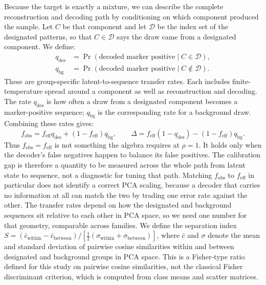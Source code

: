 Because the target is exactly a mixture, we can describe the complete reconstruction and
decoding path by conditioning on which component produced the sample.
Let $C$ be that component and let $\mathcal{D}$ be the index set of the designated patterns, so
that $C\in\mathcal{D}$ says the draw came from a designated component. We define:
\[
\begin{aligned}
q_{\mathrm{des}}
  &= \Pr(\text{decoded marker positive}\mid C\in\mathcal{D}),\\
q_{\mathrm{bg}}
  &= \Pr(\text{decoded marker positive}\mid C\notin\mathcal{D}).
\end{aligned}
\]
These are group-specific latent-to-sequence transfer rates. Each includes
finite-temperature spread around a component as well as reconstruction and decoding.
The rate $q_{\mathrm{des}}$ is how often a draw from a designated component becomes a
marker-positive sequence; $q_{\mathrm{bg}}$ is the corresponding rate for a background draw.
Combining these rates gives:
\begin{equation}\label{eq:decoder-pushforward}
  f_{\mathrm{obs}}
  = f_{\mathrm{eff}}q_{\mathrm{des}}
  + (1-f_{\mathrm{eff}})q_{\mathrm{bg}},
  \qquad
  \Delta
  = f_{\mathrm{eff}}(1-q_{\mathrm{des}})
  - (1-f_{\mathrm{eff}})q_{\mathrm{bg}}.
\end{equation}
Thus $f_{\mathrm{obs}}=f_{\mathrm{eff}}$ is not something the algebra requires at
$\rho=1$. It holds only when the decoder's false negatives happen to balance its
false positives. The calibration gap is therefore a quantity to be measured across
the whole path from latent state to sequence, not a diagnostic for tuning that
path. Matching $f_{\mathrm{obs}}$ to $f_{\mathrm{eff}}$ in particular does not
identify a correct PCA scaling, because a decoder that carries no information at
all can match the two by trading one error rate against the other.
The transfer rates depend on how the designated and background sequences sit relative to each
other in PCA space, so we need one number for that geometry, comparable across families.
We define the separation index
$S = (\bar{c}_{\mathrm{within}} - \bar{c}_{\mathrm{between}}) /
[\tfrac{1}{2}(\sigma_{\mathrm{within}} + \sigma_{\mathrm{between}})]$, where $\bar{c}$ and
$\sigma$ denote the mean and standard deviation of pairwise cosine similarities within and
between designated and background groups in PCA space. This is a Fisher-type ratio defined for this study
on pairwise cosine similarities, not the classical Fisher discriminant criterion,
which is computed from class means and scatter matrices.
